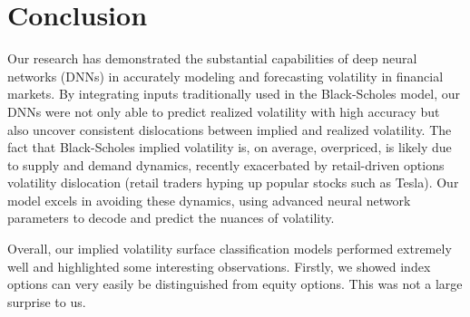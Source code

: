 \documentclass[10pt]{article}
\begin{document}
\section{Conclusion}

Our research has demonstrated the substantial capabilities of deep neural networks (DNNs) in accurately modeling and forecasting volatility in financial markets. By integrating inputs traditionally used in the Black-Scholes model, our DNNs were not only able to predict realized volatility with high accuracy but also uncover consistent dislocations between implied and realized volatility. The fact that Black-Scholes implied volatility is, on average, overpriced, is likely due to supply and demand dynamics, recently exacerbated by retail-driven options volatility dislocation (retail traders hyping up popular stocks such as Tesla). Our model excels in avoiding these dynamics, using advanced neural network parameters to decode and predict the nuances of volatility. 

Overall, our implied volatility surface classification models performed extremely well and highlighted some interesting observations. Firstly, we showed index options can very easily be distinguished from equity options. This was not a large surprise to us.
\end{document}
